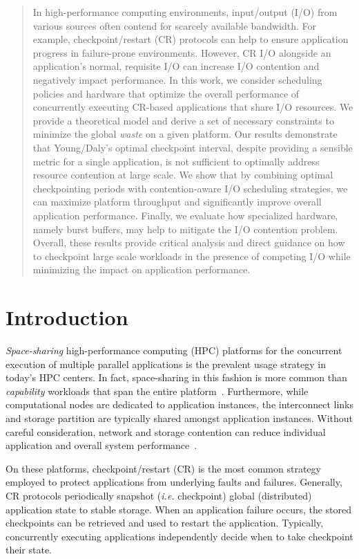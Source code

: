 \documentclass[two]{article}
\newcommand{\ie}[0]{\emph{i.e.}\xspace}
\begin{document}
\begin{abstract}
  In high-performance computing environments, input/output (I/O) from various sources
  often contend for scarcely available bandwidth. For example, checkpoint/restart
  (CR) protocols can help to ensure application progress in failure-prone
  environments.  However, CR I/O alongside an application's normal, requisite I/O can
  increase I/O contention and negatively impact performance. In this work, we
  consider scheduling policies and hardware that optimize the overall performance of
  concurrently executing CR-based applications that share I/O resources. We provide a
  theoretical model and derive a set of necessary constraints to minimize the global
  \emph{waste} on a given platform.  Our results demonstrate that Young/Daly's
  optimal checkpoint interval, despite providing a sensible metric for a single
  application, is not sufficient to optimally address resource contention at large
  scale.  We show that by combining optimal checkpointing periods with
  contention-aware I/O scheduling strategies, we can maximize platform throughput and
  significantly improve overall application performance.  Finally, we evaluate how
  specialized hardware, namely burst buffers, may help to mitigate the I/O contention
  problem.  Overall, these results provide critical analysis and direct guidance on
  how to checkpoint large scale workloads in the presence of competing I/O while
  minimizing the impact on application performance.
\end{abstract}


\section{Introduction}
\label{sec:intro}

\emph{Space-sharing} high-performance computing (HPC) platforms for the concurrent
execution of multiple parallel applications is the prevalent usage strategy in
today's HPC centers.  In fact, space-sharing in this fashion is more common than
\emph{capability} workloads that span the entire
platform~\cite{Weidner2016}. Furthermore, while computational nodes are dedicated to
application instances, the interconnect links and storage partition are
typically shared amongst application instances.  Without careful consideration,
network and storage contention can reduce individual application and overall system
performance~\cite{Bhatele:2013:Neighborhood}.

On these platforms, checkpoint/restart (CR) is the most common strategy
employed to protect applications from underlying faults and failures.
Generally, CR protocols periodically snapshot (\ie checkpoint) global
(distributed) application state to stable storage. When an application failure
occurs, the stored checkpoints can be retrieved and used to restart the
application.  Typically, concurrently executing applications independently
decide when to take checkpoint their state.
\end{document}
